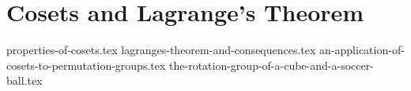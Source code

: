 \chapter{Cosets and Lagrange's Theorem}
{properties-of-cosets.tex}
{lagranges-theorem-and-consequences.tex}
{an-application-of-cosets-to-permutation-groups.tex}
{the-rotation-group-of-a-cube-and-a-soccer-ball.tex}
